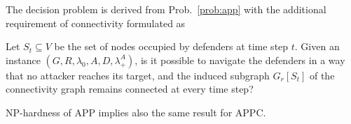 The decision problem is derived from Prob.~\ref{prob:app} with the additional requirement of connectivity formulated as
\begin{problem}
	Let $S_t\subseteq V$ be the set of nodes occupied by defenders at time step $t$.
	Given an instance $(G,R,\lambda_0,A, D, \lambda_+^A)$, is it possible to navigate the defenders in a way that no attacker reaches its target,
	and the induced subgraph $G_r\left[S_t\right]$ of the connectivity graph remains connected at every time step?
\end{problem}
NP-hardness of APP implies also the same result for APPC.

